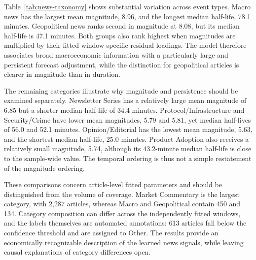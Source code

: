 Table~\ref{tab:news-taxonomy} shows substantial variation across event
types. Macro news has the largest mean magnitude, 8.96, and the longest
median half-life, 78.1 minutes. Geopolitical news ranks second in
magnitude at 8.08, but its median half-life is 47.1 minutes. Both groups
also rank highest when magnitudes are multiplied by their fitted
window-specific residual loadings. The model therefore associates
broad macroeconomic information with a particularly large and persistent
forecast adjustment, while the distinction for geopolitical articles
is clearer in magnitude than in duration.

The remaining categories illustrate why magnitude and persistence
should be examined separately. Newsletter Series has a relatively
large mean magnitude of 6.85 but a shorter median half-life of
34.4 minutes. Protocol/Infrastructure and Security/Crime have lower
mean magnitudes, 5.79 and 5.81, yet median half-lives of 56.0 and
52.1 minutes. Opinion/Editorial has the lowest mean magnitude, 5.63,
and the shortest median half-life, 25.0 minutes. Product Adoption
also receives a relatively small magnitude, 5.74, although its
43.2-minute median half-life is close to the sample-wide value.
The temporal ordering is thus not a simple restatement of the
magnitude ordering.

These comparisons concern article-level fitted parameters and should
be distinguished from the volume of coverage. Market Commentary is
the largest category, with 2,287 articles, whereas Macro and
Geopolitical contain 450 and 134. Category composition can differ
across the independently fitted windows, and the labels themselves
are automated annotations: 613 articles fall below the confidence
threshold and are assigned to Other. The results provide an
economically recognizable description of the learned news signals,
while leaving causal explanations of category differences open.
